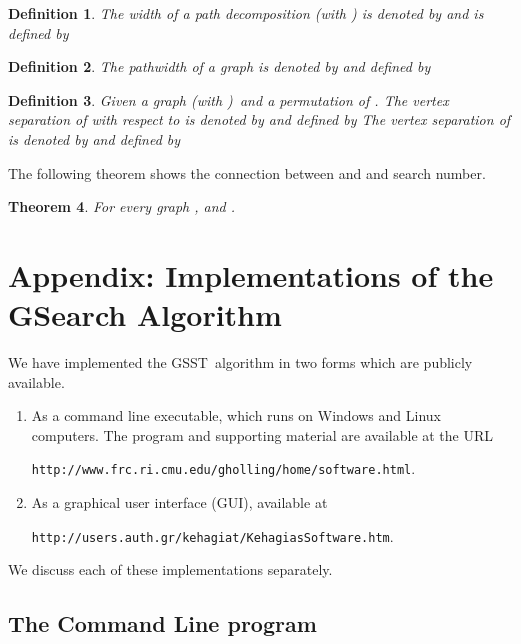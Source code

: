 \documentclass[11pt]{article}\usepackage{amsmath}
\newtheorem{theorem}{Theorem}[section]
\newtheorem{definition}[theorem]{Definition}
\begin{document}
\begin{definition}
\label{def0205}The \emph{width} of a path decomposition  (with
) is denoted by  and
is defined by


\end{definition}

\begin{definition}
\label{def0206}The \emph{pathwidth} of a graph  is denoted by  and defined by


\end{definition}

\begin{definition}
\label{def0207}Given a graph  (with
)\ and a permutation  of . The \emph{vertex separation }of  with
respect to  is denoted by  and defined by
The \emph{vertex separation }of  is denoted by  and defined by

\end{definition}

The following theorem shows the connection between  and  and search number.

\begin{theorem}
For every graph ,  and .
\end{theorem}

\newpage

\section{Appendix: Implementations of the GSearch Algorithm}

\label{secD}

We have implemented the GSST\ algorithm in two forms which are publicly available.

\begin{enumerate}
\item As a command line executable, which runs on Windows and Linux computers.
The program and supporting material are available at the URL\ 

\qquad\qquad\texttt{http://www.frc.ri.cmu.edu/gholling/home/software.html}.

\item As a graphical user interface (GUI), available at

\qquad\qquad\qquad\texttt{http://users.auth.gr/kehagiat/KehagiasSoftware.htm}.
\end{enumerate}

We discuss each of these implementations separately.

\subsection{The Command Line program}
\end{document}
